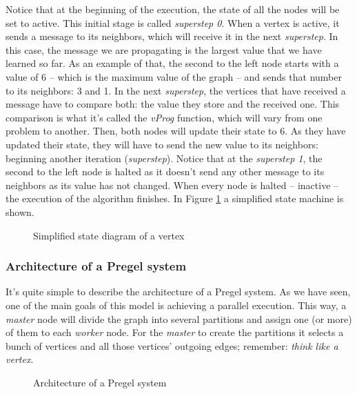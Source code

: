 Notice that at the beginning of the execution, the state of all the nodes will be set to active. This initial stage is called \textit{superstep 0}. When a vertex is active, it sends a message to its neighbors, which will receive it in the next \textit{superstep}. In this case, the message we are propagating is the largest value that we have learned so far. As an example of that, the second to the left node starts with a value of 6 -- which is the maximum value of the graph -- and sends that number to its neighbors: 3 and 1. In the next \textit{superstep}, the vertices that have received a message have to compare both: the value they store and the received one. This comparison is what it's called the \textit{vProg} function, which will vary from one problem to another. Then, both nodes will update their state to 6. As they have updated their state, they will have to send the new value to its neighbors: beginning another iteration (\textit{superstep}). Notice that at the \textit{superstep 1}, the second to the left node is halted as it doesn't send any other message to its neighbors as its value has not changed. When every node is halted -- inactive -- the execution of the algorithm finishes. In Figure \ref{fig:state} a simplified state machine is shown.

\begin{figure}[ht]
    \centering
    
    \caption[Simplified state diagram of a vertex]{Simplified state diagram of a vertex~\cite{10.1145/1807167.1807184}}
    \label{fig:state}
\end{figure}

\subsubsection{Architecture of a Pregel system}

It's quite simple to describe the architecture of a Pregel system. As we have seen, one of the main goals of this model is achieving a parallel execution. This way, a \textit{master} node will divide the graph into several partitions and assign one (or more) of them to each \textit{worker} node. For the \textit{master} to create the partitions it selects a bunch of vertices and all those vertices' outgoing edges; remember: \textit{think like a vertex}.

\begin{figure}[p]
    \centering
    
    \caption[Architecture of a Pregel system]{Architecture of a Pregel system~\cite{10.1145/3349265}}
    \label{fig:architecture:pregel}
\end{figure}